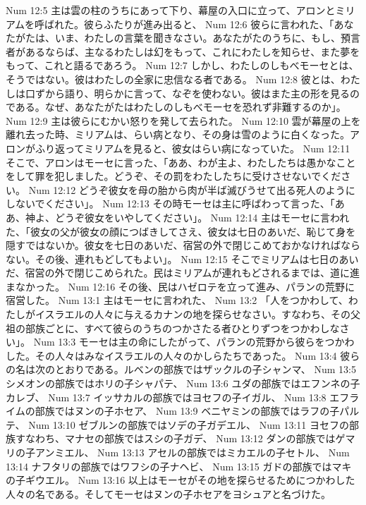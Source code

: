 Num 12:5  主は雲の柱のうちにあって下り、幕屋の入口に立って、アロンとミリアムを呼ばれた。彼らふたりが進み出ると、
Num 12:6  彼らに言われた、「あなたがたは、いま、わたしの言葉を聞きなさい。あなたがたのうちに、もし、預言者があるならば、主なるわたしは幻をもって、これにわたしを知らせ、また夢をもって、これと語るであろう。
Num 12:7  しかし、わたしのしもべモーセとは、そうではない。彼はわたしの全家に忠信なる者である。
Num 12:8  彼とは、わたしは口ずから語り、明らかに言って、なぞを使わない。彼はまた主の形を見るのである。なぜ、あなたがたはわたしのしもべモーセを恐れず非難するのか」。
Num 12:9  主は彼らにむかい怒りを発して去られた。
Num 12:10  雲が幕屋の上を離れ去った時、ミリアムは、らい病となり、その身は雪のように白くなった。アロンがふり返ってミリアムを見ると、彼女はらい病になっていた。
Num 12:11  そこで、アロンはモーセに言った、「ああ、わが主よ、わたしたちは愚かなことをして罪を犯しました。どうぞ、その罰をわたしたちに受けさせないでください。
Num 12:12  どうぞ彼女を母の胎から肉が半ば滅びうせて出る死人のようにしないでください」。
Num 12:13  その時モーセは主に呼ばわって言った、「ああ、神よ、どうぞ彼女をいやしてください」。
Num 12:14  主はモーセに言われた、「彼女の父が彼女の顔につばきしてさえ、彼女は七日のあいだ、恥じて身を隠すではないか。彼女を七日のあいだ、宿営の外で閉じこめておかなければならない。その後、連れもどしてもよい」。
Num 12:15  そこでミリアムは七日のあいだ、宿営の外で閉じこめられた。民はミリアムが連れもどされるまでは、道に進まなかった。
Num 12:16  その後、民はハゼロテを立って進み、パランの荒野に宿営した。
Num 13:1  主はモーセに言われた、
Num 13:2  「人をつかわして、わたしがイスラエルの人々に与えるカナンの地を探らせなさい。すなわち、その父祖の部族ごとに、すべて彼らのうちのつかさたる者ひとりずつをつかわしなさい」。
Num 13:3  モーセは主の命にしたがって、パランの荒野から彼らをつかわした。その人々はみなイスラエルの人々のかしらたちであった。
Num 13:4  彼らの名は次のとおりである。ルベンの部族ではザックルの子シャンマ、
Num 13:5  シメオンの部族ではホリの子シャパテ、
Num 13:6  ユダの部族ではエフンネの子カレブ、
Num 13:7  イッサカルの部族ではヨセフの子イガル、
Num 13:8  エフライムの部族ではヌンの子ホセア、
Num 13:9  ベニヤミンの部族ではラフの子パルテ、
Num 13:10  ゼブルンの部族ではソデの子ガデエル、
Num 13:11  ヨセフの部族すなわち、マナセの部族ではスシの子ガデ、
Num 13:12  ダンの部族ではゲマリの子アンミエル、
Num 13:13  アセルの部族ではミカエルの子セトル、
Num 13:14  ナフタリの部族ではワフシの子ナヘビ、
Num 13:15  ガドの部族ではマキの子ギウエル。
Num 13:16  以上はモーセがその地を探らせるためにつかわした人々の名である。そしてモーセはヌンの子ホセアをヨシュアと名づけた。
